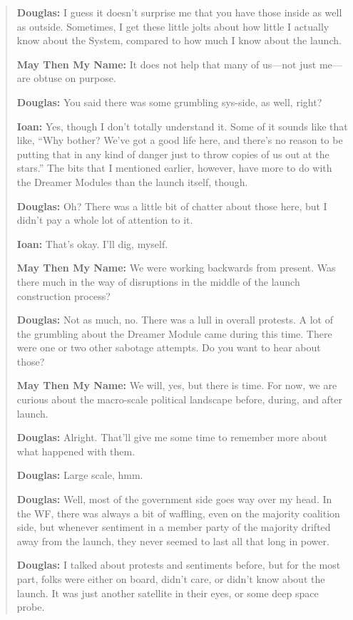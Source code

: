 \begin{quote}
\textbf{Douglas:} I guess it doesn't surprise me that you have those inside as well as outside. Sometimes, I get these little jolts about how little I actually know about the System, compared to how much I know about the launch.

\textbf{May Then My Name:} It does not help that many of us---not just me---are obtuse on purpose.

\textbf{Douglas:} You said there was some grumbling sys-side, as well, right?

\textbf{Ioan:} Yes, though I don't totally understand it. Some of it sounds like that like, ``Why bother? We've got a good life here, and there's no reason to be putting that in any kind of danger just to throw copies of us out at the stars.'' The bits that I mentioned earlier, however, have more to do with the Dreamer Modules than the launch itself, though.

\textbf{Douglas:} Oh? There was a little bit of chatter about those here, but I didn't pay a whole lot of attention to it.

\textbf{Ioan:} That's okay. I'll dig, myself.

\textbf{May Then My Name:} We were working backwards from present. Was there much in the way of disruptions in the middle of the launch construction process?

\textbf{Douglas:} Not as much, no. There was a lull in overall protests. A lot of the grumbling about the Dreamer Module came during this time. There were one or two other sabotage attempts. Do you want to hear about those?

\textbf{May Then My Name:} We will, yes, but there is time. For now, we are curious about the macro-scale political landscape before, during, and after launch.

\textbf{Douglas:} Alright. That'll give me some time to remember more about what happened with them.

\textbf{Douglas:} Large scale, hmm.

\textbf{Douglas:} Well, most of the government side goes way over my head. In the WF, there was always a bit of waffling, even on the majority coalition side, but whenever sentiment in a member party of the majority drifted away from the launch, they never seemed to last all that long in power.

\textbf{Douglas:} I talked about protests and sentiments before, but for the most part, folks were either on board, didn't care, or didn't know about the launch. It was just another satellite in their eyes, or some deep space probe.


\end{quote}
